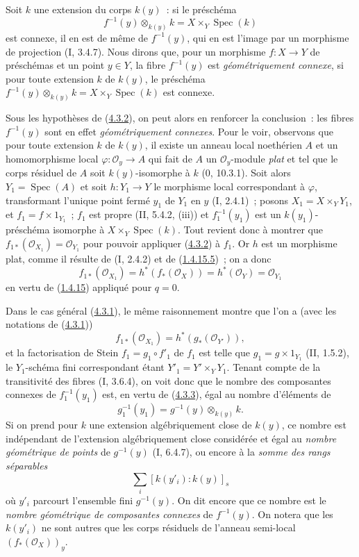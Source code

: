 \begin{remark}[4.3.4]
\label{III.4.3.4-fr}
Soit $k$ une extension du corps $k(y)$~: si le préschéma
\[
f^{-1}(y)\otimes_{k(y)}k=X\times_Y\operatorname{Spec}(k)
\]
est connexe, il en est de même de $f^{-1}(y)$, qui en est l'image par un
morphisme de projection (I, 3.4.7). Nous dirons que, pour un morphisme
$f:X\to Y$ de préschémas et un point $y\in Y$, la fibre $f^{-1}(y)$ est
\emph{géométriquement connexe}, si pour toute extension $k$ de $k(y)$, le
préschéma
$f^{-1}(y)\otimes_{k(y)}k=X\times_Y\operatorname{Spec}(k)$ est connexe.


Sous les hypothèses de (\hyperref[III.4.3.2-fr]{4.3.2}), on peut alors en
renforcer la conclusion~: les fibres $f^{-1}(y)$ sont en effet
\emph{géométriquement connexes}. Pour le voir, observons que pour toute
extension $k$ de $k(y)$, il existe un anneau local noethérien $A$ et un
homomorphisme local $\varphi:\mathcal O_y\to A$ qui fait de $A$ un
$\mathcal O_y$-module \emph{plat} et tel que le corps résiduel de $A$ soit
$k(y)$-isomorphe à $k$ (0, 10.3.1). Soit alors
$Y_1=\operatorname{Spec}(A)$ et soit $h:Y_1\to Y$ le morphisme local
correspondant à $\varphi$, transformant l'unique point fermé $y_1$ de $Y_1$
en $y$ (I, 2.4.1)~; posons
$X_1=X\times_YY_1$, et $f_1=f\times1_{Y_1}$~; $f_1$ est propre
(II, 5.4.2, (iii)) et $f_1^{-1}(y_1)$ est un $k(y_1)$-préschéma isomorphe à
$X\times_Y\operatorname{Spec}(k)$. Tout revient donc à montrer que
$f_{1*}(\mathcal O_{X_1})=\mathcal O_{Y_1}$ pour pouvoir appliquer
(\hyperref[III.4.3.2-fr]{4.3.2}) à $f_1$. Or $h$ est un morphisme plat,
comme il résulte de (I, 2.4.2) et de
(\hyperref[III.1.4.15-fr]{1.4.15.5})~; on a donc
\[
f_{1*}(\mathcal O_{X_1})
=h^*(f_*(\mathcal O_X))
=h^*(\mathcal O_Y)
=\mathcal O_{Y_1}
\]
en vertu de (\hyperref[III.1.4.15-fr]{1.4.15}) appliqué pour $q=0$.

Dans le cas général (\hyperref[III.4.3.1-fr]{4.3.1}), le même raisonnement
montre que l'on a (avec les notations de
(\hyperref[III.4.3.1-fr]{4.3.1}))
\[
f_{1*}(\mathcal O_{X_1})=h^*(g_*(\mathcal O_{Y'})),
\]
et la factorisation de Stein $f_1=g_1\circ f'_1$ de $f_1$ est telle que
$g_1=g\times1_{Y_1}$ (II, 1.5.2), le $Y_1$-schéma fini correspondant étant
$Y'_1=Y'\times_YY_1$. Tenant compte de la transitivité des fibres
(I, 3.6.4), on voit donc que le nombre des composantes connexes de
$f_1^{-1}(y_1)$ est, en vertu de
(\hyperref[III.4.3.3-fr]{4.3.3}), égal au nombre d'éléments de
\[
g_1^{-1}(y_1)=g^{-1}(y)\otimes_{k(y)}k.
\]
Si on prend pour $k$ une extension algébriquement close de $k(y)$, ce nombre
est indépendant de l'extension algébriquement close considérée et égal au
\emph{nombre géométrique de points} de $g^{-1}(y)$ (I, 6.4.7), ou encore à
la \emph{somme des rangs séparables}
\[
\sum_i[k(y'_i):k(y)]_s
\]
où $y'_i$ parcourt l'ensemble fini $g^{-1}(y)$. On dit encore que ce nombre
est le \emph{nombre géométrique de composantes connexes} de $f^{-1}(y)$. On
notera que les $k(y'_i)$ ne sont autres que les corps résiduels de l'anneau
semi-local $(f_*(\mathcal O_X))_y$.
\end{remark}

